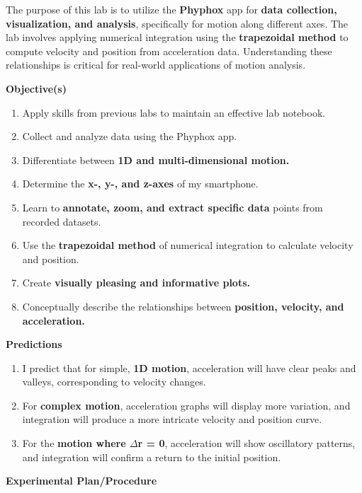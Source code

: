 \documentclass[idxtotoc,hyperref,openany]{labbook} %
\begin{document}
The purpose of this lab is to utilize the \textbf{Phyphox} app for \textbf{data collection, visualization, and analysis}, specifically for motion along different axes. The lab involves applying numerical integration using the \textbf{trapezoidal method} to compute velocity and position from acceleration data. Understanding these relationships is critical for real-world applications of motion analysis.

\hfill \break
\textbf{Objective(s)}
\begin{enumerate}[$\bullet$]
    \item Apply skills from previous labs to maintain an effective lab notebook.
    \item Collect and analyze data using the Phyphox app.
    \item Differentiate between \textbf{1D and multi-dimensional motion.}
    \item Determine the \textbf{x-, y-, and z-axes} of my smartphone.
    \item Learn to \textbf{annotate, zoom, and extract specific data} points from recorded datasets.
    \item Use the \textbf{trapezoidal method} of numerical integration to calculate velocity and position.
    \item Create \textbf{visually pleasing and informative plots.}
    \item Conceptually describe the relationships between \textbf{position, velocity, and acceleration.}
\end{enumerate}

\hfill \break
\textbf{Predictions}
\begin{enumerate}[$\bullet$]
    \item I predict that for simple, \textbf{1D motion}, acceleration will have clear peaks and valleys, corresponding to velocity changes.
    \item For \textbf{complex motion}, acceleration graphs will display more variation, and integration will produce a more intricate velocity and position curve.
    \item For the \textbf{motion where $\Delta$r = 0}, acceleration will show oscillatory patterns, and integration will confirm a return to the initial position.
\end{enumerate}

\hfill \break
\textbf{Experimental Plan/Procedure}
\end{document}
